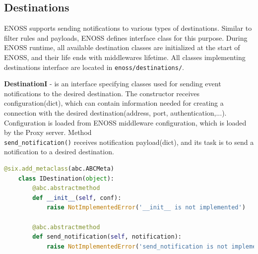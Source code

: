    \subsection{Destinations}
    ENOSS supports sending notifications to various types of destinations. Similar to filter rules and payloads, ENOSS defines interface class for this purpose. During ENOSS runtime, all available destination classes are initialized at the start of ENOSS, and their life ends with middlewares lifetime. All classes implementing destinations interface are located in \texttt{enoss/destinations/}.

    \textbf{DestinationI} - is an interface specifying classes used for sending event notifications to the desired destination. The constructor receives configuration(dict), which can contain information needed for creating a connection with the desired destination(address, port, authentication,...). Configuration is loaded from ENOSS middleware configuration, which is loaded by the Proxy server. Method \\\texttt{send\_notification()} receives notification payload(dict), and its task is to send a notification to a desired destination.

    \begin{lstlisting}[language=Python, style=pythonStyle, caption=Interface of class used for sending notification message to desired destination, label=lst:enoss-destinationi]
    @six.add_metaclass(abc.ABCMeta)
    class IDestination(object):
        @abc.abstractmethod
        def __init__(self, conf):
            raise NotImplementedError('__init__ is not implemented')

        @abc.abstractmethod
        def send_notification(self, notification):
            raise NotImplementedError('send_notification is not implemented')
    \end{lstlisting}

